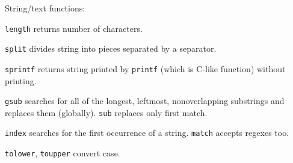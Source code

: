 String/text functions:
\begin{compactenum}
\item \texttt{length} returns number of characters.
\item \texttt{split} divides string into pieces separated by a separator.
\item \texttt{sprintf} returns string printed by \texttt{printf} (which is C-like function) without printing.
\item \texttt{gsub} searches for all of the longest, leftmost, nonoverlapping substrings and replaces them (globally). \texttt{sub} replaces only first match.
\item \texttt{index} searches for the first occurrence of a string. \texttt{match} accepts regexes too.
\item \texttt{tolower}, \texttt{toupper} convert case.
\end{compactenum}



